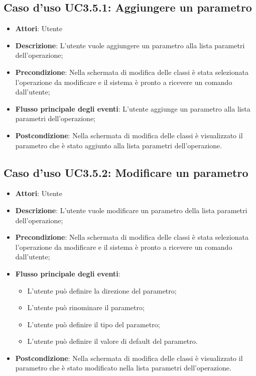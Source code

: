 \documentclass[../AnalisiDeiRequisiti.tex]{subfiles}
\begin{document}
		\subsection{Caso d'uso UC3.5.1: Aggiungere un parametro}
		\begin{itemize}
			\item \textbf{Attori}: Utente
			\item \textbf{Descrizione}: L'utente vuole aggiungere un parametro alla lista parametri dell'operazione;
			\item \textbf{Precondizione}: Nella schermata di modifica delle classi è stata selezionata l'operazione da modificare e il sistema è pronto a ricevere un comando dall'utente;
			\item \textbf{Flusso principale degli eventi}: L'utente aggiunge un parametro alla lista parametri dell'operazione;
			\item \textbf{Postcondizione}: Nella schermata di modifica delle classi è visualizzato il parametro che è stato aggiunto alla lista parametri dell'operazione.
		\end{itemize}
		\subsection{Caso d'uso UC3.5.2: Modificare un parametro}
		\begin{itemize}
			\item \textbf{Attori}: Utente
			\item \textbf{Descrizione}: L'utente vuole modificare un parametro della lista parametri dell'operazione;
			\item \textbf{Precondizione}: Nella schermata di modifica delle classi è stata selezionata l'operazione da modificare e il sistema è pronto a ricevere un comando dall'utente;
			\item \textbf{Flusso principale degli eventi}: \begin{itemize} \item L'utente può definire la direzione del parametro; \item L'utente può rinominare il parametro; \item L'utente può definire il tipo del parametro; \item L'utente può definire il valore di default del parametro. \end{itemize}
			\item \textbf{Postcondizione}: Nella schermata di modifica delle classi è visualizzato il parametro che è stato modificato nella lista parametri dell'operazione.
			\end{itemize}
\end{document}
